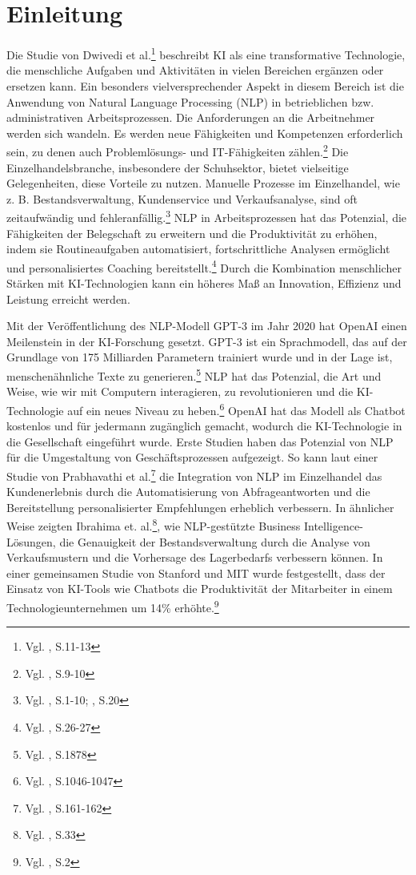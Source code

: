 

\section{Einleitung} 
\label{sec:einleitung}

Die Studie von Dwivedi et al.\footnote{Vgl. \cite{DwivediHughes2021}, S.11-13} beschreibt KI als eine transformative Technologie, die menschliche Aufgaben und Aktivitäten in vielen Bereichen ergänzen oder ersetzen kann. Ein besonders vielversprechender Aspekt in diesem Bereich ist die Anwendung von Natural Language Processing (NLP) in betrieblichen bzw. administrativen Arbeitsprozessen. Die Anforderungen an die Arbeitnehmer werden sich wandeln. Es werden neue Fähigkeiten und Kompetenzen erforderlich sein, zu denen auch Problemlösungs- und IT-Fähigkeiten zählen.\footnote{Vgl. \cite{Kadir2019}, S.9-10}
Die Einzelhandelsbranche, insbesondere der Schuhsektor, bietet vielseitige Gelegenheiten, diese Vorteile zu nutzen. Manuelle Prozesse im Einzelhandel, wie z. B. Bestandsverwaltung, Kundenservice und Verkaufsanalyse, sind oft zeitaufwändig und fehleranfällig.\footnote{Vgl. \cite{Perez2018}, S.1-10; \cite{Lee2018}, S.20} NLP in Arbeitsprozessen hat das Potenzial, die Fähigkeiten der Belegschaft zu erweitern und die Produktivität zu erhöhen, indem sie Routineaufgaben automatisiert, fortschrittliche Analysen ermöglicht und personalisiertes Coaching bereitstellt.\footnote{Vgl. \cite{Tasheva2024}, S.26-27} Durch die Kombination menschlicher Stärken mit KI-Technologien kann ein höheres Maß an Innovation, Effizienz und Leistung erreicht werden.

Mit der Veröffentlichung des NLP-Modell GPT-3 im Jahr 2020 hat OpenAI einen Meilenstein in der KI-Forschung gesetzt. GPT-3 ist ein Sprachmodell, das auf der Grundlage von 175 Milliarden Parametern trainiert wurde und in der Lage ist, menschenähnliche Texte zu generieren.\footnote{Vgl. \cite{Brown2020}, S.1878} NLP hat das Potenzial, die Art und Weise, wie wir mit Computern interagieren, zu revolutionieren und die KI-Technologie auf ein neues Niveau zu heben.\footnote{Vgl. \cite{Lu2021}, S.1046-1047} OpenAI hat das Modell als Chatbot kostenlos und für jedermann zugänglich gemacht, wodurch die KI-Technologie in die Gesellschaft eingeführt wurde. Erste Studien haben das Potenzial von NLP für die Umgestaltung von Geschäftsprozessen aufgezeigt. So kann laut einer Studie von Prabhavathi et al.\footnote{Vgl. \cite{Prabhavathi2019}, S.161-162} die Integration von NLP im Einzelhandel das Kundenerlebnis durch die Automatisierung von Abfrageantworten und die Bereitstellung personalisierter Empfehlungen erheblich verbessern. In ähnlicher Weise zeigten Ibrahima et. al.\footnote{Vgl. \cite{Ibrahima2021}, S.33}, wie NLP-gestützte Business Intelligence-Lösungen, die Genauigkeit der Bestandsverwaltung durch die Analyse von Verkaufsmustern und die Vorhersage des Lagerbedarfs verbessern können. In einer gemeinsamen Studie von Stanford und MIT wurde festgestellt, dass der Einsatz von KI-Tools wie Chatbots die Produktivität der Mitarbeiter in einem Technologieunternehmen um 14\% erhöhte.\footnote{Vgl. \cite{Brynjolfsson2023}, S.2}

